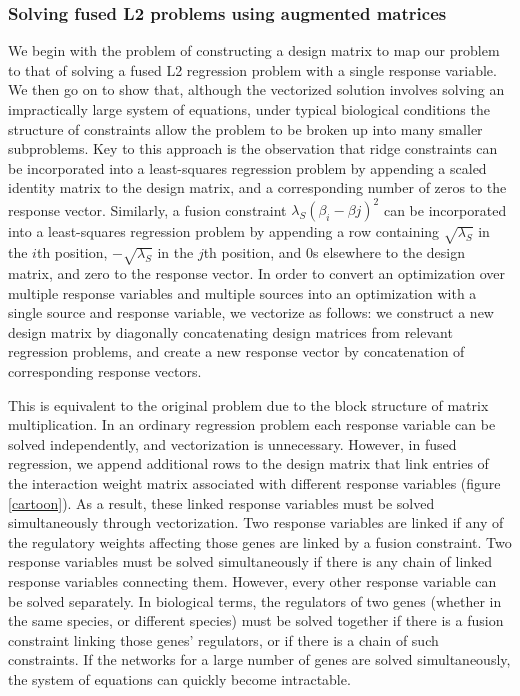 \documentclass[11pt]{article}
\begin{document}
\subsubsection{Solving fused L2 problems using augmented matrices}
We begin with the problem of constructing a design matrix to map our problem to that of solving a fused L2 regression problem with a single response variable. 
We then go on to show that, although the vectorized solution involves solving an impractically large system of equations, under typical biological conditions the structure of constraints allow the problem to be broken up into many smaller subproblems. 
Key to this approach is the observation that ridge constraints can be incorporated into a least-squares regression problem by appending a scaled identity matrix to the design matrix, and a corresponding number of zeros to the response vector. 
Similarly, a fusion constraint $\lambda_S (\beta_{i} - \beta{j})^2$ can be incorporated into a least-squares regression problem by appending a row containing $\sqrt{\lambda_S}$ in the $i$th position, $-\sqrt{\lambda_S}$ in the $j$th position, and $0$s elsewhere to the design matrix, and zero to the response vector. 
In order to convert an optimization over multiple response variables and multiple sources into an optimization with a single source and response variable, we vectorize as follows: we construct a new design matrix by diagonally concatenating design matrices from relevant regression problems, and create a new response vector by concatenation of corresponding response vectors. 

This is equivalent to the original problem due to the block structure of matrix multiplication. 
In an ordinary regression problem each response variable can be solved independently, and vectorization is unnecessary. 
However, in fused regression, we append additional rows to the design matrix that link entries of the interaction weight matrix associated with different response variables (figure \ref{cartoon}). 
As a result, these linked response variables must be solved simultaneously through vectorization. 
Two response variables are linked if any of the regulatory weights affecting those genes are linked by a fusion constraint. 
Two response variables must be solved simultaneously if there is any chain of linked response variables connecting them. 
However, every other response variable can be solved separately. 
In biological terms, the regulators of two genes (whether in the same species, or different species) must be solved together if there is a fusion constraint linking those genes' regulators, or if there is a chain of such constraints. 
If the networks for a large number of genes are solved simultaneously, the system of equations can quickly become intractable. 
\end{document}
